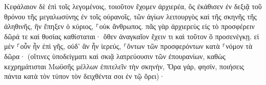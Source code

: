 \documentclass{openreader}
\begin{document}
Κεφάλαιον δὲ ἐπὶ τοῖς λεγομένοις, τοιοῦτον ἔχομεν ἀρχιερέα, ὃς ἐκάθισεν ἐν δεξιᾷ τοῦ θρόνου τῆς μεγαλωσύνης ἐν τοῖς οὐρανοῖς, 
τῶν ἁγίων λειτουργὸς καὶ τῆς σκηνῆς τῆς ἀληθινῆς, ἣν ἔπηξεν ὁ κύριος, ⸀οὐκ ἄνθρωπος. 
πᾶς γὰρ ἀρχιερεὺς εἰς τὸ προσφέρειν δῶρά τε καὶ θυσίας καθίσταται· ὅθεν ἀναγκαῖον ἔχειν τι καὶ τοῦτον ὃ προσενέγκῃ. 
εἰ μὲν ⸀οὖν ἦν ἐπὶ γῆς, οὐδ’ ἂν ἦν ἱερεύς, ⸀ὄντων τῶν προσφερόντων κατὰ ⸀νόμον τὰ δῶρα· 
(οἵτινες ὑποδείγματι καὶ σκιᾷ λατρεύουσιν τῶν ἐπουρανίων, καθὼς κεχρημάτισται Μωϋσῆς μέλλων ἐπιτελεῖν τὴν σκηνήν, Ὅρα γάρ, φησίν, ποιήσεις πάντα κατὰ τὸν τύπον τὸν δειχθέντα σοι ἐν τῷ ὄρει)· 
\end{document}
